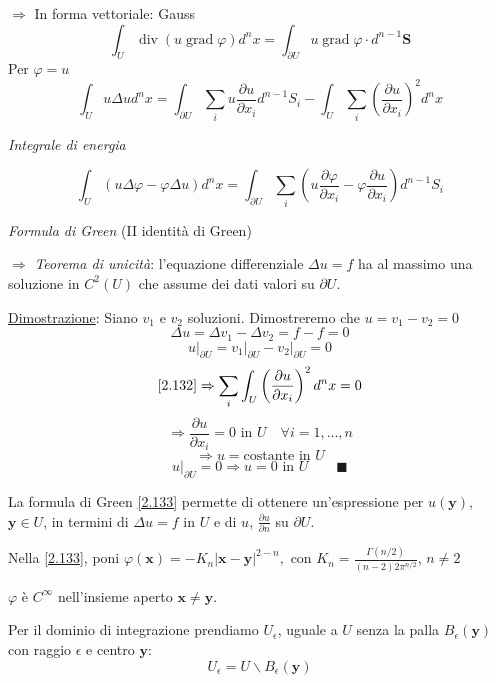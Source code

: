 \documentclass[a4paper,11pt]{report}
\newcommand{\vect}[1]{\boldsymbol{#1}}
\newcommand{\x}{\boldsymbol{x}}
\newcommand{\y}{\boldsymbol{y}}
\begin{document}
$\Rightarrow$ In forma vettoriale: Gauss
\[
\int_U \operatorname{div} (u \operatorname{grad} \varphi) d^n x = \int_{\partial U} u \operatorname{grad} \varphi \cdot d^{n-1} \vect{S}
\]
Per $\varphi=u$
\begin{equation}
\int_U u\Delta u d^n x = \int_{\partial U} \sum_i u\frac{\partial u}{\partial x_i}d^{n-1}S_i - \int_{U}\sum_i \left(\frac{\partial u}{\partial x_i}\right)^2 d^n x
\label{2.132}
\end{equation}
\centerline{\emph{Integrale di energia}}

\begin{equation}
\int_U \left(u\Delta \varphi - \varphi \Delta u\right)d^n x=\int_{\partial U} \sum_i \left( u\frac{\partial \varphi}{\partial x_i} - \varphi \frac{\partial u}{\partial x_i}\right) d^{n-1}S_i
\label{2.133}
\end{equation}
\centerline{\emph{Formula di Green} (II identit\`a di Green)}

\medskip

$\Rightarrow$ \emph{Teorema di unicit\`a}: l'equazione differenziale $\Delta u = f$ ha al massimo una soluzione in $C^2(U)$ che assume dei dati valori su $\partial U$.

\underline{Dimostrazione}: Siano $v_1$ e $v_2$ soluzioni. Dimostreremo che $u=v_1 - v_2=0$
\[
\Delta u=\Delta v_1 - \Delta v_2 = f-f =0
\]
\[
u\big|_{\partial U} = v_1 \big|_{\partial U} - v_2 \big|_{\partial U}=0
\]
\[
\eqref{2.132}\Rightarrow \sum_i\int_U \left(\frac{\partial u}{\partial x_i}\right)^2 d^n x=0
\]
\[
\Rightarrow \frac{\partial u}{\partial x_i}=0 \text{ in }U \quad \forall i=1,\ldots,n
\]
\[
\Rightarrow u= \text{costante in }U
\]
\[
u \big|_{\partial U}=0 \Rightarrow u=0 \text{ in }U \qquad \blacksquare
\]

La formula di Green \eqref{2.133} permette di ottenere un'espressione per $ u(\y)$, $\y \in U$, in termini di $\Delta u=f$ in $U$ e di $u$, $\frac{\partial u}{\partial n}$ su $\partial U$.

Nella \eqref{2.133}, poni $\varphi(\x)=-K_n|\x-\y|^{2-n},$ con $K_n= \frac{\Gamma (n/2)}{(n-2)2\pi ^{n/2}}$, $n\neq 2$

$\varphi$ \`e $C^\infty$ nell'insieme aperto $\x \neq \y$. 

Per il dominio di integrazione prendiamo $U_\epsilon$, uguale a $U$ senza la palla $B_\epsilon(\y)$ con raggio $\epsilon$ e centro $\y$:
\[
U_\epsilon = U \smallsetminus B_\epsilon(\y)
\]

\end{document}
